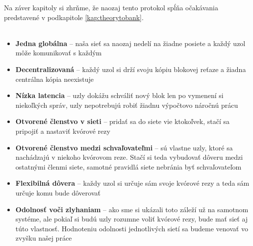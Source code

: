 \vspace{10mm}
Na záver kapitoly si zhrňme, že naozaj tento protokol spĺňa očakávania predstavené
v podkapitole \ref{kap:theorytobank}.
\\
\\

\begin{itemize}
\item  \textbf{Jedna globálna} -- naša sieť sa naozaj nedelí na žiadne posiete
a každý uzol môže komunikovať s každým
\item  \textbf{Decentralizovaná} -- každý uzol si drží svoju kópiu blokovej reťaze
a žiadna centrálna kópia neexistuje
\item  \textbf{Nízka latencia} -- uzly dokážu schváliť nový blok len po vymenení si
niekoľkých správ, uzly nepotrebujú robiť žiadnu výpočtovo náročnú prácu
\item  \textbf{Otvorené členstvo v sieti} -- pridať sa do siete vie ktokoľvek, stačí
sa pripojiť a nastaviť kvórové rezy
\item  \textbf{Otvorené členstvo medzi schvaľovateľmi} --  sú
vlastne uzly, ktoré sa nachádzajú v niekoho kvórovom reze. Stačí si teda vybudovať
dôveru medzi ostatnými členmi siete, samotné pravidlá siete nebránia byť schvaľovateľom
\item  \textbf{Flexibilná dôvera} -- každy uzol si určuje sám svoje kvórové rezy a teda
sám určuje komu bude dôverovať
\item  \textbf{Odolnosť voči zlyhaniam} -- ako sme si ukázali toto záleží už na samotnom
systéme, ale pokiaľ si budú uzly rozumne voliť kvórové rezy, bude mať sieť aj túto vlastnosť.
Hodnoteniu odolnosti jednotlivých sietí sa budeme venovať vo zvyšku našej práce
\end{itemize}